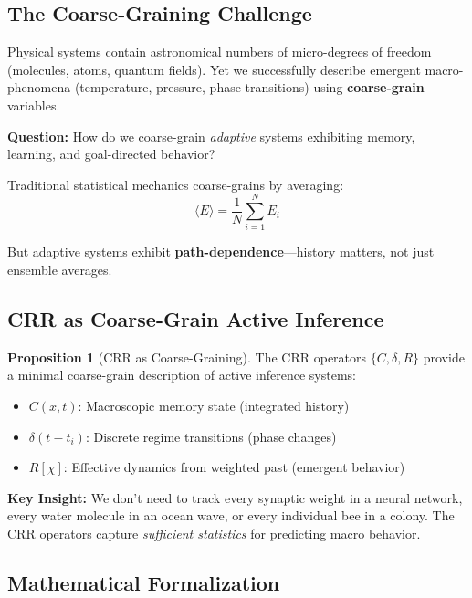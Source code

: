 \documentclass[11pt,a4paper]{article}
\theoremstyle{definition}
\newtheorem{proposition}{Proposition}[section]
\theoremstyle{remark}
\begin{document}
\subsection{The Coarse-Graining Challenge}

Physical systems contain astronomical numbers of micro-degrees of freedom (molecules, atoms, quantum fields). Yet we successfully describe emergent macro-phenomena (temperature, pressure, phase transitions) using \textbf{coarse-grain} variables.

\textbf{Question:} How do we coarse-grain \emph{adaptive} systems exhibiting memory, learning, and goal-directed behavior?

Traditional statistical mechanics coarse-grains by averaging:
\begin{equation}
\langle E \rangle = \frac{1}{N}\sum_{i=1}^N E_i
\end{equation}

But adaptive systems exhibit \textbf{path-dependence}—history matters, not just ensemble averages.

\subsection{CRR as Coarse-Grain Active Inference}

\begin{proposition}[CRR as Coarse-Graining]
The CRR operators $\{C, \delta, R\}$ provide a minimal coarse-grain description of active inference systems:
\begin{itemize}
\item \textbf{$C(x,t)$}: Macroscopic memory state (integrated history)
\item \textbf{$\delta(t-t_i)$}: Discrete regime transitions (phase changes)
\item \textbf{$R[\chi]$}: Effective dynamics from weighted past (emergent behavior)
\end{itemize}
\end{proposition}

\textbf{Key Insight:} We don't need to track every synaptic weight in a neural network, every water molecule in an ocean wave, or every individual bee in a colony. The CRR operators capture \emph{sufficient statistics} for predicting macro behavior.

\subsection{Mathematical Formalization}
\end{document}
